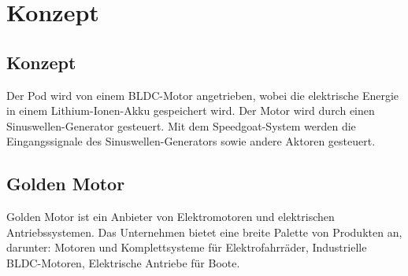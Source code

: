 \chapter{Konzept}

\section{Konzept}
Der Pod wird von einem BLDC-Motor angetrieben, wobei die elektrische Energie in einem Lithium-Ionen-Akku gespeichert wird. Der Motor wird durch einen Sinuswellen-Generator gesteuert. Mit dem Speedgoat-System werden die Eingangssignale des Sinuswellen-Generators sowie andere Aktoren gesteuert.

\section{Golden Motor}
\label{Golden_Motor}
Golden Motor ist ein Anbieter von Elektromotoren und elektrischen Antriebssystemen. Das Unternehmen bietet eine breite Palette von Produkten an, darunter:
Motoren und Komplettsysteme für Elektrofahrräder, Industrielle BLDC-Motoren, Elektrische Antriebe für Boote.


